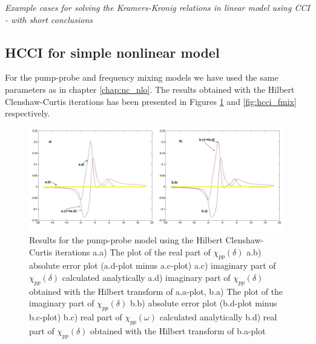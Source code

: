\documentclass[12pt,twoside,a4paper]{article}
\numberwithin{equation}{subsection}
\numberwithin{figure}{subsection}
\begin{document}
\textit{Example cases for solving the Kramers-Kronig relations in linear model using CCI - with short conclusions}

\subsection{HCCI for simple nonlinear model} \label{chap:hcc_nlo}

For the pump-probe and frequency mixing models we have used the same parameters as in chapter \ref{chap:nc_nlo}. The results
obtained with the Hilbert Clenshaw-Curtis iterations has been presented in Figures \ref{fig:hcci_pnp} and \ref{fig:hcci_fmix}
respectively.

\begin{figure} 
  \includegraphics[width=150mm]{img/hcc_pnp.png}
  \caption{Results for the pump-probe model using the Hilbert Clenshaw-Curtis iterations
     a.a) The plot of the real part of ${\chi_{pp}}(\delta )$
     a.b) absolute error plot (a.d-plot minus a.c-plot) 
     a.c) imaginary part of ${\chi_{pp}}(\delta )$ calculated analytically 
     a.d) imaginary part of ${\chi_{pp}}(\delta )$ obtained with the Hilbert transform of a.a-plot, 
     b.a) The plot of the imaginary part of ${\chi_{pp}}(\delta )$ 
     b.b) absolute error plot (b.d-plot minus b.c-plot) 
     b.c) real part of $\chi_{pp} (\omega )$ calculated analytically 
     b.d) real part of ${\chi_{pp}}(\delta )$ obtained with the Hilbert transform of b.a-plot 
     \label{fig:hcci_pnp}
     }
\end{figure} 
\end{document}
